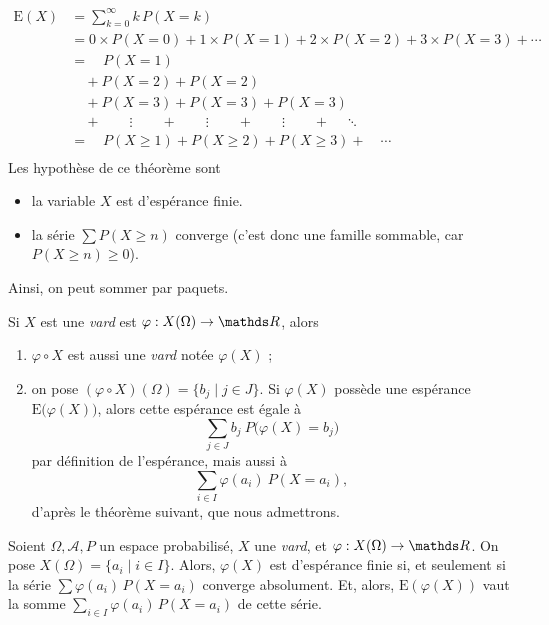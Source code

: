 \begin{prop}
  \begin{align*}
    \mathrm{E}(X) &= \sum_{k=0}^\infty k\, P(X = k)\\
    &= 0 \times P(X = 0) + 1 \times P(X = 1) + 2 \times P(X = 2) + 3 \times P(X = 3) + \cdots \\
    &=\quad P(X = 1)\\
    &\quad + P(X = 2) + P(X = 2)\\
    &\quad + P(X = 3) + P(X = 3) + P(X = 3)\\[-2mm]
    &\quad+\quad\quad \vdots\quad\quad +\quad\quad \vdots \quad\quad+\quad\quad \vdots \quad\quad+\quad\ddots\\
    &= \quad P(X \ge 1) + P(X \ge 2) + P(X \ge 3) +\quad\cdots \\
  \end{align*}
  Les hypothèse de ce théorème sont
  \begin{itemize}
    \item la variable $X$\/ est d'espérance finie.
    \item la série $\sum P(X \ge n)$\/ converge (c'est donc une famille sommable, car $P(X \ge n) \ge 0$).
  \end{itemize}
  Ainsi, on peut sommer par paquets.
\end{prop}

\begin{rmk}
  Si $X$\/ est une \textit{vard} est $\varphi : X(\Omega) \to \R$, alors
  \begin{enumerate}
    \item $\varphi \circ X$\/ est aussi une \textit{vard} notée $\varphi(X)$\/ ;
    \item on pose $(\varphi  \circ X)(\Omega) = \{b_j \mid j \in J\}$. Si $\varphi(X)$\/ possède une espérance $\mathrm{E}\big(\varphi(X)\big)$, alors cette espérance est égale à \[
      \sum_{j \in J} b_j\:P\big(\varphi(X) = b_j\big)
    \] par définition de l'espérance, mais aussi à \[
      \sum_{i \in I} \varphi(a_i)\: P(X = a_i)
    ,\] d'après le théorème suivant, que nous admettrons.
  \end{enumerate}
\end{rmk}

\begin{thm}
  Soient $\Omega, \mathcal{A}, P$\/ un espace probabilisé, $X$\/ une \textit{vard}, et $\varphi : X(\Omega) \to \R$. On pose $X(\Omega) = \{a_i  \mid i \in I\}$.
  Alors, $\varphi(X)$\/ est d'espérance finie si, et seulement si la série $\sum \varphi(a_i)\, P(X = a_i)$\/ converge absolument. Et, alors, $\mathrm{E}(\varphi(X))$\/ vaut la somme $\sum_{i \in I} \varphi(a_i)\, P(X = a_i)$\/ de cette série.
\end{thm}

